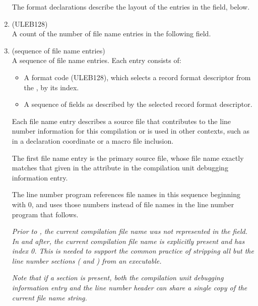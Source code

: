 \begin{enumerate}[1. ]
The format declarations describe the layout of the entries
in the \HFNfilenames{} field, below.
\eb

\item \HFNfilenamescount{} (ULEB128) \\
A count of the number of file name entries 
\db
in the following \HFNfilenames{} field.

\item \HFNfilenames{} (sequence of file name entries) \\
\bb
A sequence of file name entries. Each entry consists of:
\begin{itemize}
\setlength{\itemsep}{0em}
\item A format code (ULEB128), which selects a record format 
descriptor from the \HFNfilenameformattable{}, by its index.

\item A sequence of fields as described by the selected record 
format descriptor.
\end{itemize}

Each file name entry describes a source file that
contributes
\eb
to the line number information for this
compilation or is used in other contexts, such as in
a declaration coordinate or a macro file inclusion.
 
\bb
The first file name entry is the primary source file,
\eb 
whose file name exactly matches that given in the 
\DWATname{} attribute in the compilation unit 
debugging information entry.
   
The line number program references file names in this 
sequence beginning with 0, and uses those numbers instead 
of file names in the line number program that follows.

\textit{Prior to \DWARFVersionV, the current compilation 
file name was not represented in the \HFNfilenames{}
field. In \DWARFVersionV and 
\bbeb
after, the current compilation file name 
is explicitly present and has index 0. This is needed to support 
the common practice of stripping all but the line number sections
(\dotdebugline{} and \dotdebuglinestr) from an executable.}

\textit{Note that if a \dotdebuglinestr{} section is present, 
both the compilation unit debugging information entry 
and the line number header can
share a single copy of the current file name string.}

\end{enumerate}

